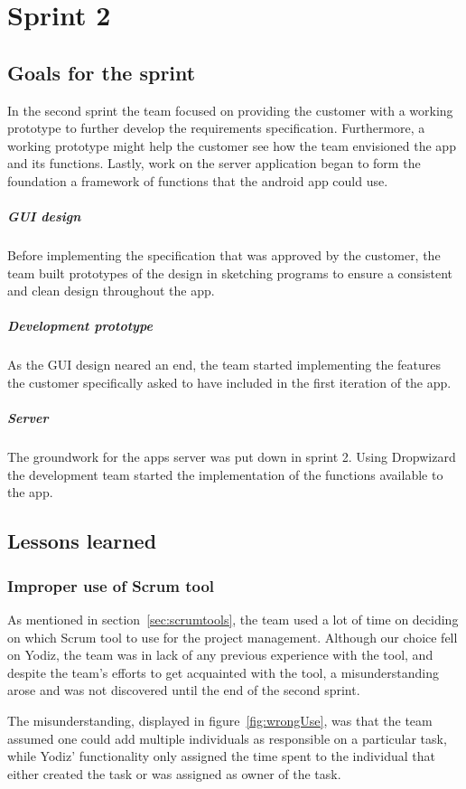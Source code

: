 \section{Sprint 2}

\subsection{Goals for the sprint}
In the second sprint the team focused on providing the customer with a working prototype to further develop the requirements specification. Furthermore, a working prototype might help the customer see how the team envisioned the app and its functions. Lastly, work on the server application began to form the foundation a framework of functions that the android app could use.

\subparagraph{GUI design}
Before implementing the specification that was approved by the customer, the team built prototypes of the design in sketching programs to ensure a consistent and clean design throughout the app. 

\subparagraph{Development prototype}
As the GUI design neared an end, the team started implementing the features the customer specifically asked to have included in the first iteration of the app.

\subparagraph{Server}
The groundwork for the apps server was put down in sprint 2. Using Dropwizard the development team started the implementation of the functions available to the app.

\subsection{Lessons learned}

\subsubsection{Improper use of Scrum tool}
As mentioned in section~\ref{sec:scrumtools}, the team used a lot of time on deciding on which Scrum tool to use for the project management. Although our choice fell on Yodiz, the team was in lack of any previous experience with the tool, and despite the team's efforts to get acquainted with the tool, a misunderstanding arose and was not discovered until the end of the second sprint.

The misunderstanding, displayed in figure~\ref{fig:wrongUse}, was that the team assumed one could add multiple individuals as responsible on a particular task, while Yodiz' functionality only assigned the time spent to the individual that either created the task or was assigned as owner of the task.

